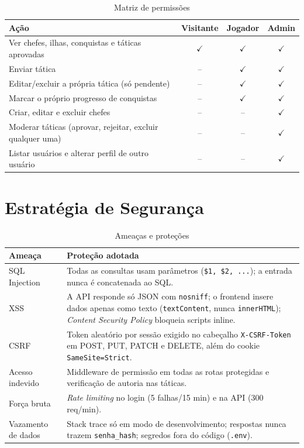 \documentclass[12pt,a4paper]{article}
\newcommand{\cod}[1]{\texttt{#1}}
\begin{document}
\begin{table}[H]
\centering
\begin{tabular}{|p{8.2cm}|c|c|c|}
\hline
\textbf{Ação} & \textbf{Visitante} & \textbf{Jogador} & \textbf{Admin} \\ \hline
Ver chefes, ilhas, conquistas e táticas aprovadas & $\checkmark$ & $\checkmark$ & $\checkmark$ \\ \hline
Enviar tática & -- & $\checkmark$ & $\checkmark$ \\ \hline
Editar/excluir a própria tática (só pendente) & -- & $\checkmark$ & $\checkmark$ \\ \hline
Marcar o próprio progresso de conquistas & -- & $\checkmark$ & $\checkmark$ \\ \hline
Criar, editar e excluir chefes & -- & -- & $\checkmark$ \\ \hline
Moderar táticas (aprovar, rejeitar, excluir qualquer uma) & -- & -- & $\checkmark$ \\ \hline
Listar usuários e alterar perfil de outro usuário & -- & -- & $\checkmark$ \\ \hline
\end{tabular}
\caption{Matriz de permissões}
\end{table}

\section{Estratégia de Segurança}

\begin{table}[H]
\centering
\begin{tabular}{|p{3.2cm}|p{11.3cm}|}
\hline
\textbf{Ameaça} & \textbf{Proteção adotada} \\ \hline
SQL Injection & Todas as consultas usam parâmetros (\cod{\$1, \$2, ...}); a entrada nunca é concatenada ao SQL. \\ \hline
XSS & A API responde só JSON com \cod{nosniff}; o frontend insere dados apenas como texto (\cod{textContent}, nunca \cod{innerHTML}); \textit{Content Security Policy} bloqueia scripts inline. \\ \hline
CSRF & Token aleatório por sessão exigido no cabeçalho \cod{X-CSRF-Token} em POST, PUT, PATCH e DELETE, além do cookie \cod{SameSite=Strict}. \\ \hline
Acesso indevido & Middleware de permissão em todas as rotas protegidas e verificação de autoria nas táticas. \\ \hline
Força bruta & \textit{Rate limiting} no login (5 falhas/15 min) e na API (300 req/min). \\ \hline
Vazamento de dados & Stack trace só em modo de desenvolvimento; respostas nunca trazem \cod{senha\_hash}; segredos fora do código (\cod{.env}). \\ \hline
\end{tabular}
\caption{Ameaças e proteções}
\end{table}
\end{document}
